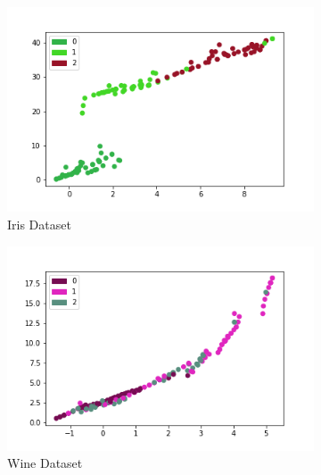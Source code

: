 \documentclass[11pt, a4paper]{article}
\begin{document}
    \begin{figure}[h]
        \centering
        \begin{subfigure}[b]{0.3\textwidth}
            \centering
            \includegraphics[width=\textwidth]{iris_angle_1.png}
            \caption{Iris Dataset}
            \label{iris_angle}
        \end{subfigure}
        \hfill
        \begin{subfigure}[b]{0.3\textwidth}
            \centering
            \includegraphics[width=\textwidth]{wine_angle_1.png}
            \caption{Wine Dataset}
            \label{wine_angle}
        \end{subfigure}
        \hfill
        \begin{subfigure}[b]{0.3\textwidth}
            \centering

\end{subfigure}
\end{figure}
\end{document}
